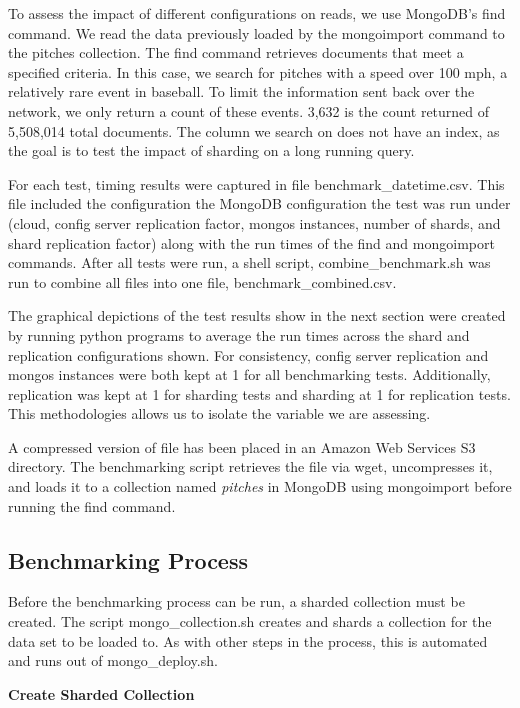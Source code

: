 \documentclass[9pt,twocolumn,twoside]{../../styles/osajnl}
\begin{document}
To assess the impact of different configurations on reads, we use MongoDB's find command.  We read the data previously loaded by the mongoimport command to the pitches collection.  The find command retrieves documents that meet a specified criteria.  In this case, we search for pitches with a speed over 100 mph, a relatively rare event in baseball.  To limit the information sent back over the network, we only return a count of these events.  3,632 is the count returned of 5,508,014 total documents.  The column we search on does not have an index, as the goal is to test the impact of sharding on a long running query.


For each test, timing results were captured in file benchmark\_datetime.csv.  This file included the configuration the MongoDB configuration the test was run under (cloud, config server replication factor, mongos instances, number of shards, and shard replication factor) along with the run times of the find and mongoimport commands.  After all tests were run, a shell script, combine\_benchmark.sh was run to combine all files into one file, benchmark\_combined.csv.

The graphical depictions of the test results show in the next section were created by running python programs to average the run times across the shard and replication configurations shown.  For consistency, config server replication and mongos instances were both kept at 1 for all benchmarking tests.  Additionally, replication was kept at 1 for sharding tests and sharding at 1 for replication tests.  This methodologies allows us to isolate the variable we are assessing.



A compressed version of file has been placed in an Amazon Web Services S3 directory.  The benchmarking script retrieves the file via wget, uncompresses it, and loads it to a collection named \emph{pitches} in MongoDB using mongoimport before running the find command.


\subsection{Benchmarking Process}

Before the benchmarking process can be run, a sharded collection must be created.  The script mongo\_collection.sh creates and shards a collection for the data set to be loaded to.  As with other steps in the process, this is automated and runs out of mongo\_deploy.sh.

\textbf{Create Sharded Collection}
\end{document}
